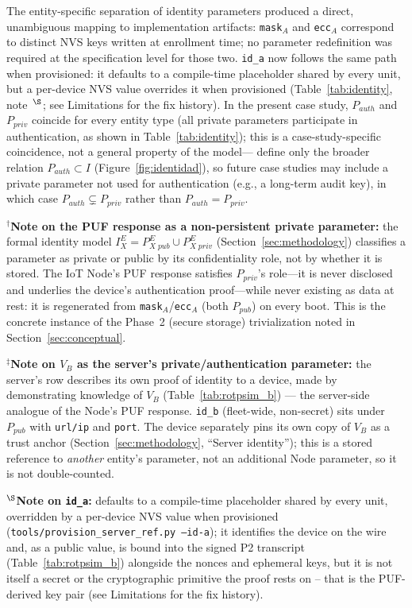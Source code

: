 \documentclass[preprint,12pt,authoryear]{elsarticle}
\begin{document}
The entity-specific separation of identity parameters produced a direct, unambiguous mapping to implementation artifacts: \texttt{mask}$_A$ and \texttt{ecc}$_A$ correspond to distinct NVS keys written at enrollment time; no parameter redefinition was required at the specification level for those two. \texttt{id\_a} now follows the same path when provisioned: it defaults to a compile-time placeholder shared by every unit, but a per-device NVS value overrides it when provisioned (Table~\ref{tab:identity}, note~$^\S$; see Limitations for the fix history). In the present case study, $P_{auth}$ and $P_{priv}$ coincide for every entity type (all private parameters participate in authentication, as shown in Table~\ref{tab:identity}); this is a case-study-specific coincidence, not a general property of the model---\citet{campos2026identity} define only the broader relation $P_{auth} \subset I$ (Figure~\ref{fig:identidad}), so future case studies may include a private parameter not used for authentication (e.g., a long-term audit key), in which case $P_{auth} \subsetneq P_{priv}$ rather than $P_{auth} = P_{priv}$.

$^\dagger$\textbf{Note on the PUF response as a non-persistent private parameter:} the formal identity model $I^E_X = P^E_{X\;pub} \cup P^E_{X\;priv}$ (Section~\ref{sec:methodology}) classifies a parameter as private or public by its confidentiality role, not by whether it is stored. The IoT Node's PUF response satisfies $P_{priv}$'s role---it is never disclosed and underlies the device's authentication proof---while never existing as data at rest: it is regenerated from \texttt{mask}$_A$/\texttt{ecc}$_A$ (both $P_{pub}$) on every boot. This is the concrete instance of the Phase~2 (secure storage) trivialization noted in Section~\ref{sec:conceptual}.

$^\ddagger$\textbf{Note on $V_B$ as the server's private/authentication parameter:} the server's row describes its own proof of identity to a device, made by demonstrating knowledge of $V_B$ (Table~\ref{tab:rotpsim_b}) --- the server-side analogue of the Node's PUF response. \texttt{id\_b} (fleet-wide, non-secret) sits under $P_{pub}$ with \texttt{url/ip} and \texttt{port}. The device separately pins its own copy of $V_B$ as a trust anchor (Section~\ref{sec:methodology}, ``Server identity''); this is a stored reference to \emph{another} entity's parameter, not an additional Node parameter, so it is not double-counted.

$^\S$\textbf{Note on \texttt{id\_a}:} defaults to a compile-time placeholder shared by every unit, overridden by a per-device NVS value when provisioned (\texttt{tools/provision\_server\_ref.py --id-a}); it identifies the device on the wire and, as a public value, is bound into the signed P2 transcript (Table~\ref{tab:rotpsim_b}) alongside the nonces and ephemeral keys, but it is not itself a secret or the cryptographic primitive the proof rests on -- that is the PUF-derived key pair (see Limitations for the fix history).
\end{document}
